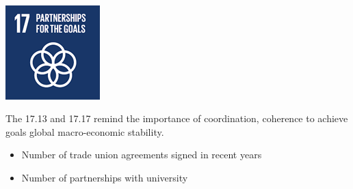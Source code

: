 \\
\begin{minipage}[c]{0.2\textwidth}
    \includegraphics[width=\textwidth]{Images/Social_sustainability/17_partnerships.png}
\end{minipage}
\begin{minipage}[c]{0.8\textwidth}
The 17.13 and 17.17 remind the importance of coordination, coherence to achieve goals global macro-economic stability. 
\begin{itemize}
    \item Number of trade union agreements signed in recent years
    \item Number of partnerships with university
\end{itemize}
\end{minipage}



